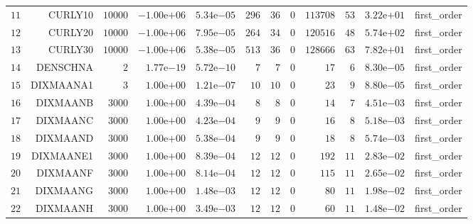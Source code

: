 \begin{longtable}{rrrrrrrrrrrr}
  \(    11\) & CURLY10 & \( 10000\) & \(-1.00\)e\(+06\) & \( 5.34\)e\(-05\) & \(   296\) & \(    36\) & \(     0\) & \(113708\) & \(    53\) & \( 3.22\)e\(+01\) & first\_order \\
  \(    12\) & CURLY20 & \( 10000\) & \(-1.00\)e\(+06\) & \( 7.95\)e\(-05\) & \(   264\) & \(    34\) & \(     0\) & \(120516\) & \(    48\) & \( 5.74\)e\(+02\) & first\_order \\
  \(    13\) & CURLY30 & \( 10000\) & \(-1.00\)e\(+06\) & \( 5.38\)e\(-05\) & \(   513\) & \(    36\) & \(     0\) & \(128666\) & \(    63\) & \( 7.82\)e\(+01\) & first\_order \\
  \(    14\) & DENSCHNA & \(     2\) & \( 1.77\)e\(-19\) & \( 5.72\)e\(-10\) & \(     7\) & \(     7\) & \(     0\) & \(    17\) & \(     6\) & \( 8.30\)e\(-05\) & first\_order \\
  \(    15\) & DIXMAANA1 & \(     3\) & \( 1.00\)e\(+00\) & \( 1.21\)e\(-07\) & \(    10\) & \(    10\) & \(     0\) & \(    23\) & \(     9\) & \( 8.80\)e\(-05\) & first\_order \\
  \(    16\) & DIXMAANB & \(  3000\) & \( 1.00\)e\(+00\) & \( 4.39\)e\(-04\) & \(     8\) & \(     8\) & \(     0\) & \(    14\) & \(     7\) & \( 4.51\)e\(-03\) & first\_order \\
  \(    17\) & DIXMAANC & \(  3000\) & \( 1.00\)e\(+00\) & \( 4.23\)e\(-04\) & \(     9\) & \(     9\) & \(     0\) & \(    16\) & \(     8\) & \( 5.18\)e\(-03\) & first\_order \\
  \(    18\) & DIXMAAND & \(  3000\) & \( 1.00\)e\(+00\) & \( 5.38\)e\(-04\) & \(     9\) & \(     9\) & \(     0\) & \(    18\) & \(     8\) & \( 5.74\)e\(-03\) & first\_order \\
  \(    19\) & DIXMAANE1 & \(  3000\) & \( 1.00\)e\(+00\) & \( 8.39\)e\(-04\) & \(    12\) & \(    12\) & \(     0\) & \(   192\) & \(    11\) & \( 2.83\)e\(-02\) & first\_order \\
  \(    20\) & DIXMAANF & \(  3000\) & \( 1.00\)e\(+00\) & \( 8.14\)e\(-04\) & \(    12\) & \(    12\) & \(     0\) & \(   115\) & \(    11\) & \( 2.65\)e\(-02\) & first\_order \\
  \(    21\) & DIXMAANG & \(  3000\) & \( 1.00\)e\(+00\) & \( 1.48\)e\(-03\) & \(    12\) & \(    12\) & \(     0\) & \(    80\) & \(    11\) & \( 1.98\)e\(-02\) & first\_order \\
  \(    22\) & DIXMAANH & \(  3000\) & \( 1.00\)e\(+00\) & \( 3.49\)e\(-03\) & \(    12\) & \(    12\) & \(     0\) & \(    60\) & \(    11\) & \( 1.48\)e\(-02\) & first\_order \\

\end{longtable}
